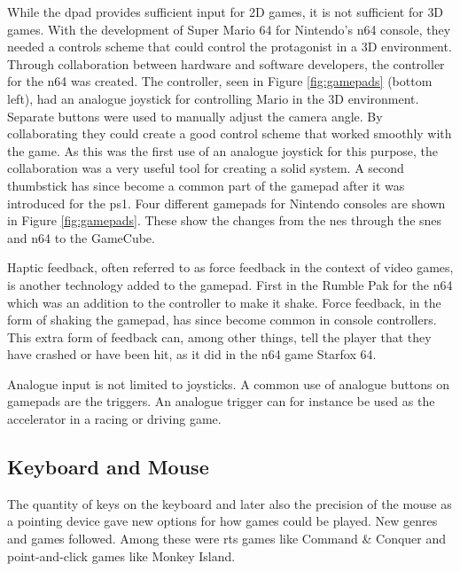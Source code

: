 
While the \gls{dpad} provides sufficient input for 2D games, it is not sufficient for 3D games.
With the development of Super Mario 64 for Nintendo's \gls{n64} console, they needed a controls scheme that could control the protagonist in a 3D environment.
Through collaboration between hardware and software developers, the controller for the \gls{n64} was created.
The controller, seen in Figure \ref{fig:gamepads} (bottom left), had an analogue joystick for controlling Mario in the 3D environment. %
Separate buttons were used to manually adjust the camera angle.
By collaborating they could create a good control scheme that worked smoothly with the game.
As this was the first use of an analogue joystick for this purpose, the collaboration was a very useful tool for creating a solid system.
A second thumbstick has since become a common part of the gamepad after it was introduced for the \gls{ps1}.
Four different gamepads for Nintendo consoles are shown in Figure \ref{fig:gamepads}.
These show the changes from the \gls{nes} through the \gls{snes} and \gls{n64} to the GameCube.

Haptic feedback, often referred to as force feedback in the context of video games, is another technology added to the gamepad.
First in the Rumble Pak for the \gls{n64} which was an addition to the controller to make it shake.
Force feedback, in the form of shaking the gamepad, has since become common in console controllers.
This extra form of feedback can, among other things, tell the player that they have crashed or have been hit, as it did in the \gls{n64} game Starfox 64.

Analogue input is not limited to joysticks.
A common use of analogue buttons on gamepads are the triggers.
An analogue trigger can for instance be used as the accelerator in a racing or driving game.


\subsection{Keyboard and Mouse}
The quantity of keys on the keyboard and later also the precision of the mouse as a pointing device gave new options for how games could be played.
New genres and games followed.
Among these were \gls{rts} games like Command \& Conquer and point-and-click games like Monkey Island.

